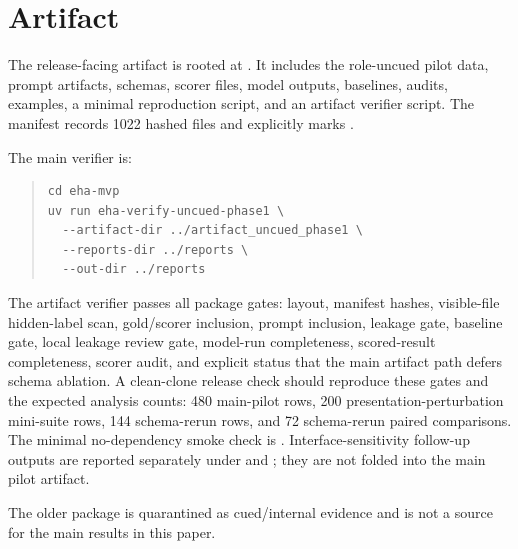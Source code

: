 \section{Artifact}

The release-facing artifact is rooted at . It includes the role-uncued pilot data, prompt artifacts, schemas, scorer files, model outputs, baselines, audits, examples, a minimal reproduction script, and an artifact verifier script. The manifest records 1022 hashed files and explicitly marks .

The main verifier is:
\begin{quote}
\small
\begin{verbatim}
cd eha-mvp
uv run eha-verify-uncued-phase1 \
  --artifact-dir ../artifact_uncued_phase1 \
  --reports-dir ../reports \
  --out-dir ../reports
\end{verbatim}
\end{quote}

The artifact verifier passes all package gates: layout, manifest hashes, visible-file hidden-label scan, gold/scorer inclusion, prompt inclusion, leakage gate, baseline gate, local leakage review gate, model-run completeness, scored-result completeness, scorer audit, and explicit status that the main artifact path defers schema ablation. A clean-clone release check should reproduce these gates and the expected analysis counts: 480 main-pilot rows, 200 presentation-perturbation mini-suite rows, 144 schema-rerun rows, and 72 schema-rerun paired comparisons. The minimal no-dependency smoke check is . Interface-sensitivity follow-up outputs are reported separately under  and ; they are not folded into the main pilot artifact.

The older  package is quarantined as cued/internal evidence and is not a source for the main results in this paper.

